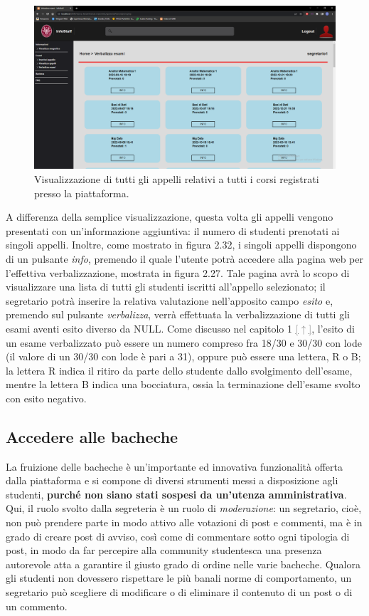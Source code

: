 \documentclass [a4paper,11pt]{book}
\begin{document}
\begin{figure}
\centering
\includegraphics[scale=0.3]{figura2-32.png}
\caption{Visualizzazione di tutti gli appelli relativi a tutti i corsi registrati presso la piattaforma.}
\end{figure}

A differenza della semplice visualizzazione, questa volta gli appelli vengono presentati con un'informazione aggiuntiva: il numero di studenti prenotati ai singoli appelli. Inoltre, come mostrato in figura 2.32, i singoli appelli dispongono di un pulsante \emph{info}, premendo il quale l'utente potrà accedere alla pagina web per l'effettiva verbalizzazione, mostrata in figura 2.27. Tale pagina avrà lo scopo di visualizzare una lista di tutti gli studenti iscritti all'appello selezionato; il segretario potrà inserire la relativa valutazione nell'apposito campo \emph{esito} e, premendo sul pulsante \emph{verbalizza}, verrà effettuata la verbalizzazione di tutti gli esami aventi esito diverso da NULL. Come discusso nel capitolo 1 \hyperref[sec:specifiche]{\textcolor{gray}{[$\uparrow$]}}, l'esito di un esame verbalizzato può essere un numero compreso fra 18/30 e 30/30 con lode (il valore di un 30/30 con lode è pari a 31), oppure può essere una lettera, R o B; la lettera R indica il ritiro da parte dello studente dallo svolgimento dell'esame, mentre la lettera B indica una bocciatura, ossia la terminazione dell'esame svolto con esito negativo.

\medskip

\subsection{Accedere alle bacheche}

La fruizione delle bacheche è un'importante ed innovativa funzionalità offerta dalla piattaforma e si compone di diversi strumenti messi a disposizione agli studenti, \textbf{purché non siano stati sospesi da un'utenza amministrativa}. Qui, il ruolo svolto dalla segreteria è un ruolo di \emph{moderazione}: un segretario, cioè, non può prendere parte in modo attivo alle votazioni di post e commenti, ma è in grado di creare post di avviso, così come di commentare sotto ogni tipologia di post, in modo da far percepire alla community studentesca una presenza autorevole atta a garantire il giusto grado di ordine nelle varie bacheche. Qualora gli studenti non dovessero rispettare le più banali norme di comportamento, un segretario può scegliere di modificare o di eliminare il contenuto di un post o di un commento.
\end{document}
